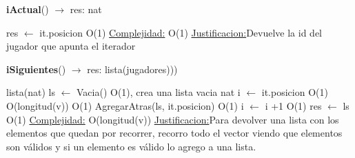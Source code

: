 \begin{Algoritmos}
\begin{algorithm}[H]{\textbf{iActual}() $\to$ res: nat}
	\begin{algorithmic}[1]
		\State res $\gets$ it.posicion \Comment O(1)
		\medskip
		\Statex \underline{Complejidad:} O(1)
		\Statex \underline{Justificacion:}Devuelve la id del jugador que apunta el iterador  
	\end{algorithmic}
\end{algorithm}
	
\begin{algorithm}[H]{\textbf{iSiguientes}() $\to$ res: lista(jugadores)))}
	\begin{algorithmic}[1]
		\State lista(nat) ls $\gets$ Vacia() \Comment O(1), crea una lista vacia
		\State nat i $\gets$ it.posicion \Comment O(1)
		 \Comment O(longitud(v))
			 \Comment O(1)
				\State AgregarAtras(ls, it.posicion) \Comment O(1)
			\EndIf
		\State i $\gets$ i +1 \Comment O(1)		
		\EndWhile
		\State res $\gets$ ls \Comment O(1)
		\medskip
		\Statex \underline{Complejidad:} O(longitud(v))
		\Statex \underline{Justificacion:}Para devolver una lista con los elementos que quedan por recorrer, recorro todo el vector viendo que elementos son válidos y si un elemento es válido lo agrego a una lista.
	\end{algorithmic}
\end{algorithm}

\end{Algoritmos}